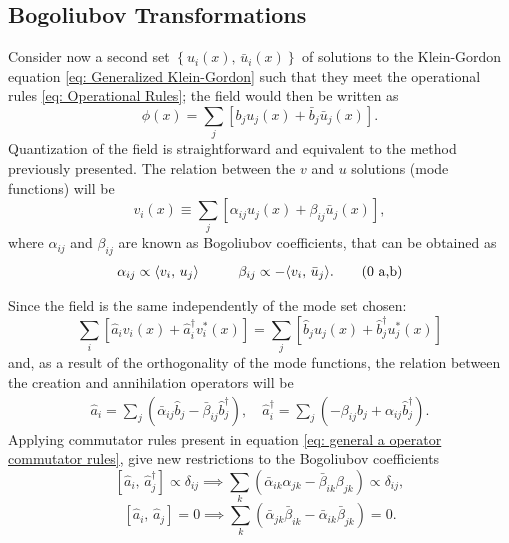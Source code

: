 \subsection{Bogoliubov Transformations}
Consider now a second set $\left\{u_i(x),\,\bar u_i(x)\right\}$ of solutions to the Klein-Gordon equation \ref{eq: Generalized Klein-Gordon} such that they meet the operational rules \ref{eq: Operational Rules}; the field would then be written as
\begin{equation}
	\phi(x)=\sum_j\left[b_ju_j(x)+\bar b_j\bar u_j(x)\right].
\end{equation}
Quantization of the field is straightforward and equivalent to the method previously presented. The relation between the $v$ and $u$ solutions (mode functions) will be
\begin{equation}
	v_i(x)\equiv\sum_j\left[\alpha_{ij}u_j(x)+\beta_{ij}\bar u_j(x)\right],
\end{equation}
where $\alpha_{ij}$ and $\beta_{ij}$ are known as Bogoliubov coefficients, that can be obtained as
\begin{subequations}\label{eq: Bogoliubov Coefficients General}
	\begin{gather}
		\alpha_{ij}\propto\langle v_i,\,u_j\rangle\hspace{1.0cm}\beta_{ij}\propto -\langle v_i,\,\bar u_j\rangle.\tag{\theequation \,\,a,b}
	\end{gather}
\end{subequations}

Since the field is the same independently of the mode set chosen:
\begin{equation}
	\sum_i\left[\hat{a}_iv_i(x)+\hat{a}_i^\dagger v^*_i(x)\right]=\sum_j\left[\hat{b}_ju_j(x)+\hat{b}_j^\dagger u_j^*(x)\right]
\end{equation}
and, as a result of the orthogonality of the mode functions, the relation between the creation and annihilation operators will be 
\begin{subequations}
	\begin{gather}
		\hat{a}_i=\sum_j\left(\bar \alpha_{ij}\hat{b}_j-\bar \beta_{ij}\hat{b}_j^\dagger\right),\quad \hat{a}_i^\dagger=\sum_j\left(-\beta_{ij}\hat{b}_j+\alpha_{ij}\hat{b}_j^\dagger\right).\tag{\theequation \,\,a,b}
	\end{gather}
\end{subequations}
Applying commutator rules present in equation \ref{eq: general a operator commutator rules}, give new restrictions to the Bogoliubov coefficients
\begin{equation}
	\left[\hat{a}_i,\,\hat{a}_j^\dagger\right]\propto\delta_{ij}\implies \sum_k\left(\bar \alpha_{ik}\alpha_{jk}-\bar \beta_{ik}\beta_{jk}\right)\propto\delta_{ij},
\end{equation}
\begin{equation}
	\left[\hat{a}_i,\,\hat{a}_j\right]=0\implies \sum_k\left(\bar \alpha_{jk}\bar \beta_{ik}-\bar \alpha_{ik}\bar \beta_{jk}\right)=0.
\end{equation}

